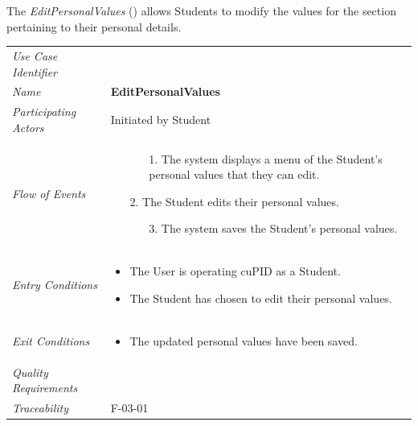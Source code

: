 \documentclass[12pt,letterpaper]{article}
\begin{document}
\newpage{}

The {\it EditPersonalValues} ({\bf \editpersonalvalues{}}) allows Students to modify the values for the section pertaining to their personal details.

\begin{center}
	\begin{tabu} to 
		\toprule
		Use Case Identifier & \editpersonalvalues{} \\
		Name & {\bf EditPersonalValues} \\
		Participating Actors & Initiated by Student \\
		Flow of Events & 
		\begin{minipage}[t]{\linewidth}
		    \begin{enumerate}
		        \item[]
		        \begin{enumerate}
				    \item[1.] The system displays a menu of the Student's personal values that they can edit.
		        \end{enumerate}
	            \item[2.] The Student edits their personal values.
	            \begin{enumerate}
				    \item[3.] The system saves the Student's personal values.
		        \end{enumerate}
			\end{enumerate}
		\end{minipage} \\

		Entry Conditions &
		\begin{minipage}[t]{\linewidth}
			\begin{itemize}
			    \item The User is operating cuPID as a Student.
			    \item The Student has chosen to edit their personal values.
	        \end{itemize}
		\end{minipage} \\

		Exit Conditions &
		\begin{minipage}[t]{\linewidth}
			\begin{itemize}
			    \item The updated personal values have been saved.
	        \end{itemize}
		\end{minipage} \\

		Quality Requirements & \\

		Traceability &  F-03-01\\
		\toprule
	\end{tabu}
\end{center}
\end{document}
